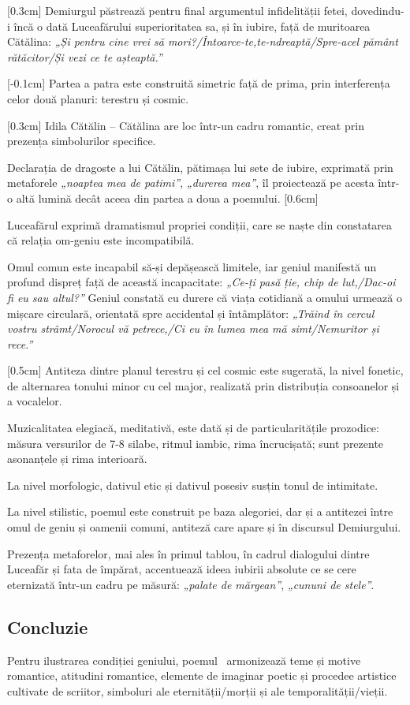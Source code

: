 [0.3cm]
Demiurgul păstrează pentru final argumentul infidelității fetei, dovedindu-i încă o dată Luceafărului superioritatea sa, și în iubire, față de muritoarea Cătălina: \textit{„Și pentru cine vrei să mori?/Întoarce-te,te-ndreaptă/Spre-acel pământ rătăcitor/Și vezi ce te așteaptă.”}

[-0.1cm]
Partea a patra este construită simetric față de prima, prin interferența celor două planuri: terestru și cosmic.

[0.3cm]
Idila Cătălin -- Cătălina are loc într-un cadru romantic, creat prin prezența simbolurilor specifice.

Declarația de dragoste a lui Cătălin, pătimașa lui sete de iubire, exprimată prin metaforele \textit{„noaptea mea de patimi”}, \textit{„durerea mea”}, îl proiectează pe acesta într-o altă lumină decât aceea din partea a doua a poemului.
[0.6cm]

Luceafărul exprimă dramatismul propriei condiții, care se naște din constatarea că relația om-geniu este incompatibilă.

Omul comun este incapabil să-și depășească limitele, iar geniul manifestă un profund dispreț față de această incapacitate: \textit{„Ce-ți pasă ție, chip de lut,/Dac-oi fi eu sau altul?”} Geniul constată cu durere că viața cotidiană a omului urmează o mișcare circulară, orientată spre accidental și întâmplător: \textit{„Trăind în cercul vostru strâmt/Norocul vă petrece,/Ci eu în lumea mea mă simt/Nemuritor și rece.”}

[0.5cm]
Antiteza dintre planul terestru și cel cosmic este sugerată, la nivel fonetic, de alternarea tonului minor cu cel major, realizată prin distribuția consoanelor și a vocalelor.

Muzicalitatea elegiacă, meditativă, este dată și de particularitățile prozodice: măsura versurilor de 7-8 silabe, ritmul iambic, rima încrucișată; sunt prezente asonanțele și rima interioară.

La nivel morfologic, dativul etic și dativul posesiv susțin tonul de intimitate.

La nivel stilistic, poemul este construit pe baza alegoriei, dar și a antitezei între omul de geniu și oamenii comuni, antiteză care apare și în discursul Demiurgului.

Prezența metaforelor, mai ales în primul tablou, în cadrul dialogului dintre Luceafăr și fata de împărat, accentuează ideea iubirii absolute ce se cere eternizată într-un cadru pe măsură: \textit{„palate de mărgean”}, \textit{„cununi de stele”}.


\subsection{Concluzie}

Pentru ilustrarea condiției geniului, poemul \operatitle\ armonizează teme și motive romantice, atitudini romantice, elemente de imaginar poetic și procedee artistice cultivate de scriitor, simboluri ale eternității/morții și ale temporalității/vieții.
